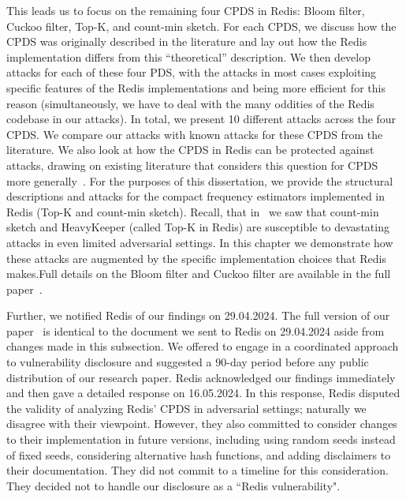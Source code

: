 This leads us to focus on the remaining four CPDS in Redis: Bloom filter, Cuckoo filter, Top-K, and count-min sketch. For each  CPDS, we discuss how the CPDS was originally described in the literature and lay out how the Redis implementation differs from this ``theoretical'' description. We then develop attacks for each of these four PDS, with the attacks in most cases exploiting specific features of the Redis implementations and being more efficient for this reason (simultaneously, we have to deal with the many oddities of the Redis codebase in our attacks). In total, we present 10 different attacks across the four CPDS. We compare our attacks with  known attacks for these CPDS from the literature. We also look at how the CPDS in Redis can be protected against attacks, drawing on existing literature that considers this question for CPDS more generally~\cite{clayton2019,FPUV22,PatersonR22,markelon23}. For the purposes of this dissertation, we provide the structural descriptions and attacks for the compact frequency estimators implemented in Redis (Top-K and count-min sketch). Recall, that in~ we saw that count-min sketch and HeavyKeeper (called Top-K in Redis) are susceptible to devastating attacks in even limited adversarial settings. In this chapter we demonstrate how these attacks are augmented by the specific implementation choices that Redis makes.Full details on the Bloom filter and Cuckoo filter are available in the full paper~\cite{cryptoeprint:2024/1312}.

Further, we notified Redis of our findings on 29.04.2024. The full version of our paper~\cite{cryptoeprint:2024/1312} is identical to the document we sent to Redis on 29.04.2024 aside from changes made in this subsection. We offered to engage in a coordinated approach to vulnerability disclosure and suggested a 90-day period before any public distribution of our research paper. Redis acknowledged our findings immediately and then gave a detailed response on 16.05.2024. In this response, Redis disputed the validity of analyzing Redis' CPDS in adversarial settings; naturally we disagree with their viewpoint. However, they also committed to consider changes to their implementation in future versions, including using random seeds instead of fixed seeds, considering alternative hash functions, and adding disclaimers to their documentation. They did not commit to a timeline for this consideration. They decided not to handle our disclosure as a ``Redis vulnerability".
